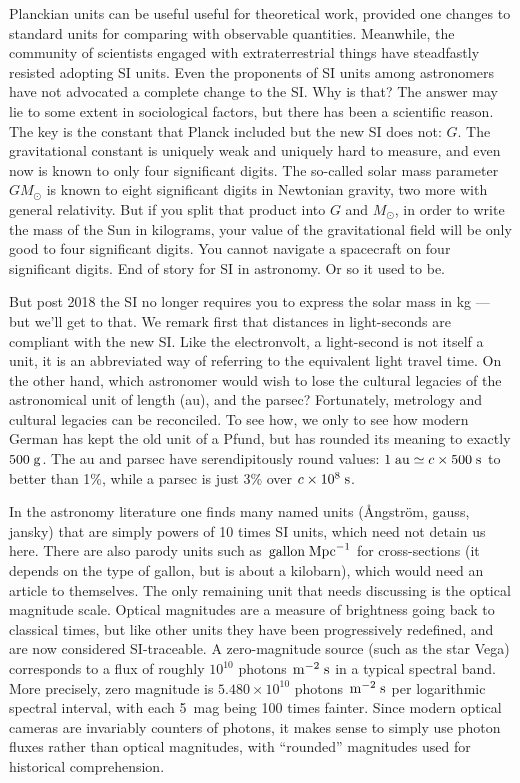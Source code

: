 \documentclass[aps,prb,12pt]{revtex4-1}
\def\unit#1{\;{\rm#1}}
\begin{document}
Planckian units can be useful useful for theoretical work, provided
one changes to standard units for comparing with observable
quantities.\cite{magicenv} Meanwhile, the community of scientists
engaged with extraterrestrial things have steadfastly resisted
adopting SI units.  Even the proponents of SI units among astronomers
\cite{dodd2011} have not advocated a complete change to the SI.  Why
is that?  The answer may lie to some extent in sociological factors,
but there has been a scientific reason.  The key is the constant that
Planck included but the new SI does not: $G$.  The gravitational
constant is uniquely weak and uniquely hard to measure, and even now
is known to only four significant digits.\cite{2018Natur.560..562S}
The so-called solar mass parameter $GM_\odot$ is known to eight
significant digits in Newtonian gravity, two more with general
relativity.  But if you split that product into $G$ and $M_\odot$, in
order to write the mass of the Sun in kilograms, your value of the
gravitational field will be only good to four significant digits.  You
cannot navigate a spacecraft on four significant digits.  End of story
for SI in astronomy.  Or so it used to be.

But post 2018 the SI no longer requires you to express the solar mass
in kg --- but we'll get to that.  We remark first that distances in
light-seconds are compliant with the new SI.  Like the electronvolt, a
light-second is not itself a unit, it is an abbreviated way of
referring to the equivalent light travel time.  On the other hand,
which astronomer would wish to lose the cultural legacies of the
astronomical unit of length (au), and the parsec?  Fortunately,
metrology and cultural legacies can be reconciled.  To see how, we
only to see how modern German has kept the old unit of a Pfund, but
has rounded its meaning to exactly $500\unit{g}$.  The au and parsec
have serendipitously round values: $1\unit{au}\simeq
c\times500\unit{s}$ to better than 1\%, while a parsec is just 3\%
over $c\times10^8\unit{s}$.

In the astronomy literature one finds many named units (\AA ngström,
gauss, jansky) that are simply powers of 10 times SI units, which need
not detain us here.  There are also parody units such as
$\!\unit{gallon}\unit{Mpc}^{-1}$ for cross-sections (it depends on the
type of gallon, but is about a kilobarn), which would need an article
to themselves.  The only remaining unit that needs discussing is the
optical magnitude scale.  Optical magnitudes are a measure of
brightness going back to classical times, but like other units they
have been progressively redefined, and are now considered
SI-traceable.  A zero-magnitude source (such as the star Vega)
corresponds to a flux of roughly $10^{10}$ photons
$\!\unit{m}^{-2}\unit{s}$ in a typical spectral band.  More precisely,
zero magnitude is $5.480 \times10^{10}$ photons
$\!\unit{m}^{-2}\unit{s}$ per logarithmic spectral interval, with each
5~mag being 100 times fainter.  Since modern optical cameras are
invariably counters of photons, it makes sense to simply use photon
fluxes rather than optical magnitudes, with ``rounded'' magnitudes
used for historical comprehension.
\end{document}
